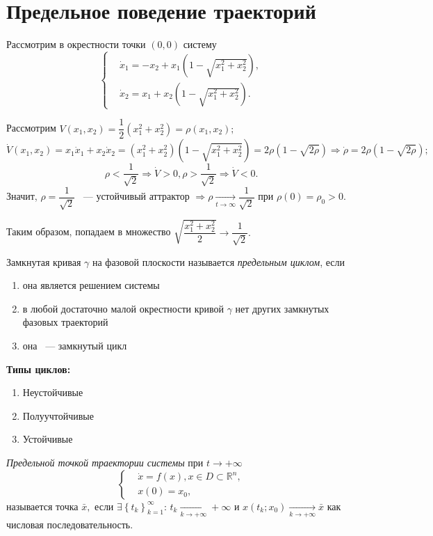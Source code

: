 \section{Предельное поведение траекторий}

Рассмотрим в окрестности точки \( (0, 0) \) систему
\[ \left\lbrace \begin{aligned}
    & \dot{x}_1 = -x_2 + x_1 \left( 1 - \sqrt{x_1^2 + x_2^2} \right), \\
    & \dot{x}_2 = x_1 + x_2 \left( 1 - \sqrt{x_1^2 + x_2^2} \right).
\end{aligned} \right. \]

Рассмотрим \( V(x_1, x_2) = \dfrac{1}{2} (x_1^2 + x_2^2) = \rho (x_1, x_2); \)
\[ \dot{V}(x_1, x_2) = x_1 \dot{x}_1 + x_2 \dot{x}_2 = (x_1^2 + x_2^2) \left( 1 - \sqrt{x_1^2 + x_2^2} \right) = 2 \rho (1 - \sqrt{2 \rho}) \Rightarrow \dot{\rho} = 2 \rho (1 - \sqrt{2 \rho}); \]
\[ \rho < \dfrac{1}{\sqrt{2}} \Rightarrow \dot{V} > 0, \rho > \dfrac{1}{\sqrt{2}} \Rightarrow \dot{V} < 0. \]
Значит, \( \rho = \dfrac{1}{\sqrt{2}} \) ~--- устойчивый аттрактор \( \Rightarrow \rho \xrightarrow[t \rightarrow \infty]{} \dfrac{1}{\sqrt{2}} \) при \( \rho(0) = \rho_0 > 0. \)

Таким образом, попадаем в множество \( \sqrt{\dfrac{x_1^2 + x_2^2}{2}} \rightarrow \dfrac{1}{\sqrt{2}}. \)

\begin{definition}
Замкнутая кривая \( \gamma \) на фазовой плоскости называется \textit{предельным циклом}, если
    \begin{enumerate}
    \item она является решением системы
    \item в любой достаточно малой окрестности кривой \( \gamma \) нет других замкнутых фазовых траекторий
    \item она ~--- замкнутый цикл
    \end{enumerate}
\end{definition}

\textbf{Типы циклов:}
\begin{enumerate}
\item Неустойчивые

\item Полуучтойчивые

\item Устойчивые

\end{enumerate}

\begin{definition}
\textit{Предельной точкой траектории системы} при \( t \rightarrow +\infty \)
\[ \left\lbrace \begin{aligned}
    & \dot{x} = f(x), x \in D \subset \mathbb{R}^n, \\
    & x(0) = x_0,
\end{aligned} \right. \]
называется точка \( \bar{x}, \) если \( \exists \left\lbrace t_k \right\rbrace_{k=1}^{\infty} \): \( t_k \xrightarrow[k \rightarrow +\infty]{} +\infty \) и \( x(t_k; x_0) \xrightarrow[k \rightarrow +\infty]{} \bar{x} \) как числовая последовательность.
\end{definition}

